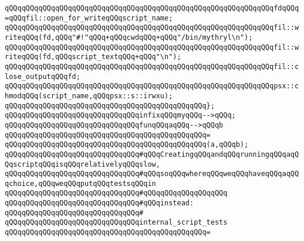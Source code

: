 \newline
\verb|qQQqqQQqqQQqqQQqqQQqqQQqqQQqqQQqqQQqqQQqqQQqqQQqqQQqqQQqqQQqqQQqfdqQQq=qQQqfil::open_for_writeqQQqscript_name;|\newline
\newline
\verb|qQQqqQQqqQQqqQQqqQQqqQQqqQQqqQQqqQQqqQQqqQQqqQQqqQQqqQQqqQQqqQQqfil::writeqQQq(fd,qQQq"#!"qQQq+qQQqcwdqQQq+qQQq"/bin/mythryl\n");|\newline
\verb|qQQqqQQqqQQqqQQqqQQqqQQqqQQqqQQqqQQqqQQqqQQqqQQqqQQqqQQqqQQqqQQqfil::writeqQQq(fd,qQQqscript_textqQQq+qQQq"\n");|\newline
\newline
\verb|qQQqqQQqqQQqqQQqqQQqqQQqqQQqqQQqqQQqqQQqqQQqqQQqqQQqqQQqqQQqqQQqfil::close_outputqQQqfd;|\newline
\newline
\verb|qQQqqQQqqQQqqQQqqQQqqQQqqQQqqQQqqQQqqQQqqQQqqQQqqQQqqQQqqQQqqQQqpsx::chmodqQQq(script_name,qQQqpsx::s::irwxu);|\newline
\verb|qQQqqQQqqQQqqQQqqQQqqQQqqQQqqQQqqQQqqQQqqQQqqQQq};|\newline
\newline
\verb|qQQqqQQqqQQqqQQqqQQqqQQqqQQqqQQqinfixqQQqmyqQQq-->qQQq;|\newline
\newline
\verb|qQQqqQQqqQQqqQQqqQQqqQQqqQQqqQQqfunqQQqaqQQq-->qQQqb|\newline
\verb|qQQqqQQqqQQqqQQqqQQqqQQqqQQqqQQqqQQqqQQqqQQqqQQq=|\newline
\verb|qQQqqQQqqQQqqQQqqQQqqQQqqQQqqQQqqQQqqQQqqQQqqQQq(a,qQQqb);|\newline
\newline
\verb|qQQqqQQqqQQqqQQqqQQqqQQqqQQqqQQq#qQQqCreatingqQQqandqQQqrunningqQQqaqQQqscriptqQQqisqQQqrelativelyqQQqslow,|\newline
\verb|qQQqqQQqqQQqqQQqqQQqqQQqqQQqqQQq#qQQqsoqQQqwhereqQQqweqQQqhaveqQQqaqQQqchoice,qQQqweqQQqputqQQqtestsqQQqin|\newline
\verb|qQQqqQQqqQQqqQQqqQQqqQQqqQQqqQQq#qQQqqQQqqQQqqQQqqQQq|\newline
\verb|qQQqqQQqqQQqqQQqqQQqqQQqqQQqqQQq#qQQqinstead:|\newline
\verb|qQQqqQQqqQQqqQQqqQQqqQQqqQQqqQQq#|\newline
\verb|qQQqqQQqqQQqqQQqqQQqqQQqqQQqqQQqinternal_script_tests|\newline
\verb|qQQqqQQqqQQqqQQqqQQqqQQqqQQqqQQqqQQqqQQqqQQqqQQq=|\newline
